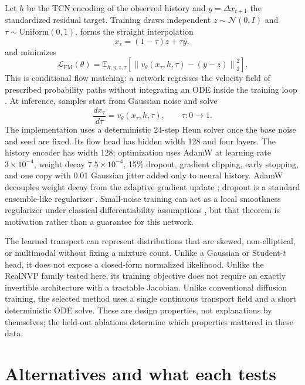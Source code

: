 \documentclass[11pt]{article}
\newcommand{\E}{\mathbb{E}}
\begin{document}
Let $h$ be the TCN encoding of the observed history and $y=\Delta x_{t+1}$ the standardized residual target. Training draws independent $z\sim\mathcal N(0,I)$ and $\tau\sim\mathrm{Uniform}(0,1)$, forms the straight interpolation
\begin{equation}
 x_\tau=(1-\tau)z+\tau y,
\end{equation}
and minimizes
\begin{equation}
 \mathcal L_{\mathrm{FM}}(\theta)
 =\E_{h,y,z,\tau}\left[
 \left\|v_\theta(x_\tau,h,\tau)-(y-z)\right\|_2^2
 \right].
 \label{eq:fm}
\end{equation}
This is conditional flow matching: a network regresses the velocity field of prescribed probability paths without integrating an ODE inside the training loop \citep{lipman2023flow,tong2024otcfm}. At inference, samples start from Gaussian noise and solve
\begin{equation}
 \frac{d x_\tau}{d\tau}=v_\theta(x_\tau,h,\tau),\qquad \tau:0\rightarrow1.
\end{equation}
The implementation uses a deterministic 24-step Heun solver once the base noise and seed are fixed. Its flow head has hidden width 128 and four layers. The history encoder has width 128; optimization uses AdamW at learning rate $3\times10^{-4}$, weight decay $7.5\times10^{-4}$, 15\% dropout, gradient clipping, early stopping, and one copy with 0.01 Gaussian jitter added only to neural history. AdamW decouples weight decay from the adaptive gradient update \citep{loshchilov2019adamw}; dropout is a standard ensemble-like regularizer \citep{srivastava2014dropout}. Small-noise training can act as a local smoothness regularizer under classical differentiability assumptions \citep{bishop1995noise}, but that theorem is motivation rather than a guarantee for this network.

The learned transport can represent distributions that are skewed, non-elliptical, or multimodal without fixing a mixture count. Unlike a Gaussian or Student-$t$ head, it does not expose a closed-form normalized likelihood. Unlike the RealNVP family tested here, its training objective does not require an exactly invertible architecture with a tractable Jacobian. Unlike conventional diffusion training, the selected method uses a single continuous transport field and a short deterministic ODE solve. These are design properties, not explanations by themselves; the held-out ablations determine which properties mattered in these data.

\section{Alternatives and what each tests}
\end{document}
